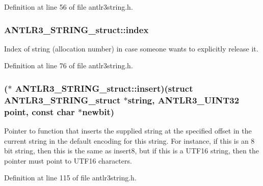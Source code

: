 Definition at line 56 of file antlr3string.\-h.

\hypertarget{struct_a_n_t_l_r3___s_t_r_i_n_g__struct_a15e2eb3d2541ac22ed9ef922e3490eaf}{
\subsubsection[{index}]{ A\-N\-T\-L\-R3\-\_\-\-S\-T\-R\-I\-N\-G\-\_\-struct\-::index}}\label{struct_a_n_t_l_r3___s_t_r_i_n_g__struct_a15e2eb3d2541ac22ed9ef922e3490eaf}
Index of string (allocation number) in case someone wants to explicitly release it. 

Definition at line 76 of file antlr3string.\-h.

\hypertarget{struct_a_n_t_l_r3___s_t_r_i_n_g__struct_a1aa58841c89fa55e6deee6b769aca462}{
\subsubsection[{insert}]{($\ast$ A\-N\-T\-L\-R3\-\_\-\-S\-T\-R\-I\-N\-G\-\_\-struct\-::insert)(struct {\bf A\-N\-T\-L\-R3\-\_\-\-S\-T\-R\-I\-N\-G\-\_\-struct} $\ast$string, {\bf A\-N\-T\-L\-R3\-\_\-\-U\-I\-N\-T32} point, const char $\ast$newbit)}}\label{struct_a_n_t_l_r3___s_t_r_i_n_g__struct_a1aa58841c89fa55e6deee6b769aca462}
Pointer to function that inserts the supplied string at the specified offset in the current string in the default encoding for this string. For instance, if this is an 8 bit string, then this is the same as insert8, but if this is a U\-T\-F16 string, then the pointer must point to U\-T\-F16 characters. 

Definition at line 115 of file antlr3string.\-h.

